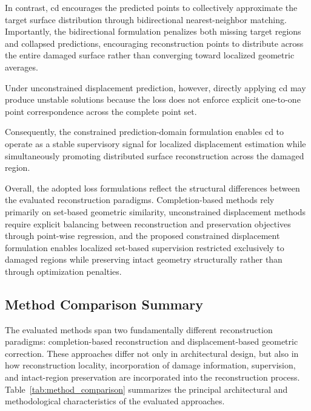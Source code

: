 In contrast, \ac{cd} encourages the predicted points to collectively approximate the target surface distribution through bidirectional nearest-neighbor matching. Importantly, the bidirectional formulation penalizes both missing target regions and collapsed predictions, encouraging reconstruction points to distribute across the entire damaged surface rather than converging toward localized geometric averages.

Under unconstrained displacement prediction, however, directly applying \ac{cd} may produce unstable solutions because the loss does not enforce explicit one-to-one point correspondence across the complete point set.

Consequently, the constrained prediction-domain formulation enables \ac{cd} to operate as a stable supervisory signal for localized displacement estimation while simultaneously promoting distributed surface reconstruction across the damaged region.

Overall, the adopted loss formulations reflect the structural differences between the evaluated reconstruction paradigms. Completion-based methods rely primarily on set-based geometric similarity, unconstrained displacement methods require explicit balancing between reconstruction and preservation objectives through point-wise regression, and the proposed constrained displacement formulation enables localized set-based supervision restricted exclusively to damaged regions while preserving intact geometry structurally rather than through optimization penalties.

\subsection{Method Comparison Summary}
\label{sec:method_summary}

The evaluated methods span two fundamentally different reconstruction paradigms: completion-based reconstruction and displacement-based geometric correction. These approaches differ not only in architectural design, but also in how reconstruction locality, incorporation of damage information, supervision, and intact-region preservation are incorporated into the reconstruction process. Table~\ref{tab:method_comparison} summarizes the principal architectural and methodological characteristics of the evaluated approaches.

